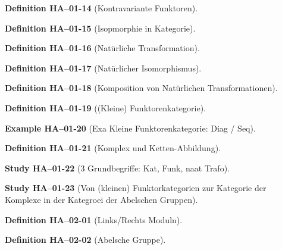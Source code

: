 \documentclass[10pt, letterpaper]{article}
\newcommand{\CustomHeading}[3]{%
  \par\medskip\noindent%
  \textbf{#1 #2} \textnormal{(#3)}.\enskip%
}
\newenvironment{DEF}[2]{\CustomHeading{Definition}{#1}{#2}}{}
\newenvironment{EXA}[2]{\CustomHeading{Example}{#1}{#2}}{}
\newenvironment{STUD}[2]{\CustomHeading{Study}{#1}{#2}}{}
\begin{document}
\begin{DEF}{HA--01-14}{Kontravariante Funktoren}
\end{DEF}

\begin{DEF}{HA--01-15}{Isopmorphie in Kategorie}
\end{DEF}

\begin{DEF}{HA--01-16}{Natürliche Transformation}
\end{DEF}

\begin{DEF}{HA--01-17}{Natürlicher Isomorphismus}
\end{DEF}

\begin{DEF}{HA--01-18}{Komposition von Natürlichen Transformationen}
\end{DEF}

\begin{DEF}{HA--01-19}{(Kleine) Funktorenkategorie}
\end{DEF}

\begin{EXA}{HA--01-20}{Exa Kleine Funktorenkategorie: Diag / Seq}
\end{EXA}

\begin{DEF}{HA--01-21}{Komplex und Ketten-Abbildung}
\end{DEF}

\begin{STUD}{HA--01-22}{3 Grundbegriffe: Kat, Funk, naat Trafo}
\end{STUD}

\begin{STUD}{HA--01-23}{Von (kleinen) Funktorkategorien zur Kategorie der Komplexe in der Kategroei der Abelschen Gruppen}
\end{STUD}

\begin{DEF}{HA--02-01}{Links/Rechts Moduln}
\end{DEF}

\begin{DEF}{HA--02-02}{Abelsche Gruppe}
\end{DEF}
\end{document}
